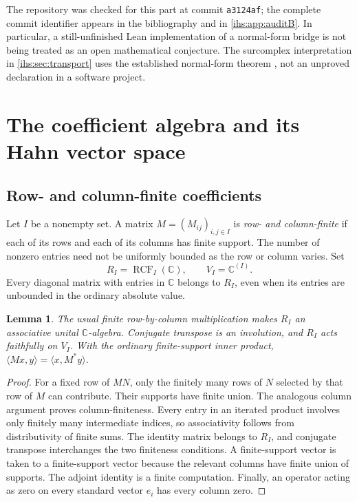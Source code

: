 \documentclass[11pt,a4paper]{article}
\numberwithin{equation}{section}
\newtheorem{lemma}[lemma]{Lemma}
\theoremstyle{definition}
\theoremstyle{remark}
\newcommand{\C}{\mathbb C}
\newcommand{\RCF}{\operatorname{RCF}}
\newcommand{\ip}[2]{\langle#1,#2\rangle}
\begin{document}
The repository was checked for this part at commit \texttt{a3124af}; the
complete commit identifier appears in the bibliography \cite{RepoPinB} and
in \cref{ihs:app:auditB}. In particular, a still-unfinished Lean
implementation of a normal-form bridge is not being treated as an open
mathematical conjecture. The surcomplex interpretation in
\cref{ihs:sec:transport} uses the established normal-form theorem
\cite{Gonshor}, not an unproved declaration in a software project.

\section{The coefficient algebra and its Hahn vector space}\label{ihs:sec:category}

\subsection{Row- and column-finite coefficients}\label{ihs:rf:sec:rcf}
Let $I$ be a nonempty set. A matrix $M=(M_{ij})_{i,j\in I}$ is
\emph{row- and column-finite} if each of its rows and each of its columns
has finite support. The number of nonzero entries need not be uniformly
bounded as the row or column varies. Set
\[
 R_I=\RCF_I(\C),\qquad V_I=\C^{(I)}.
\]
Every diagonal matrix with entries in $\C$ belongs to $R_I$, even when its
entries are unbounded in the ordinary absolute value.

\begin{lemma}\label{ihs:rf:lem:rcf}
The usual finite row-by-column multiplication makes $R_I$ an associative
unital $\C$-algebra. Conjugate transpose is an involution, and $R_I$ acts
faithfully on $V_I$. With the ordinary finite-support inner product,
$\ip{Mx}{y}=\ip{x}{M^*y}$.
\end{lemma}
\begin{proof}
For a fixed row of $MN$, only the finitely many rows of $N$ selected by that
row of $M$ can contribute. Their supports have finite union. The analogous
column argument proves column-finiteness. Every entry in an iterated product
involves only finitely many intermediate indices, so associativity follows
from distributivity of finite sums. The identity matrix belongs to $R_I$,
and conjugate transpose interchanges the two finiteness conditions. A
finite-support vector is taken to a finite-support vector because the
relevant columns have finite union of supports. The adjoint identity is a
finite computation. Finally, an operator acting as zero on every standard
vector $e_i$ has every column zero.
\end{proof}
\end{document}
